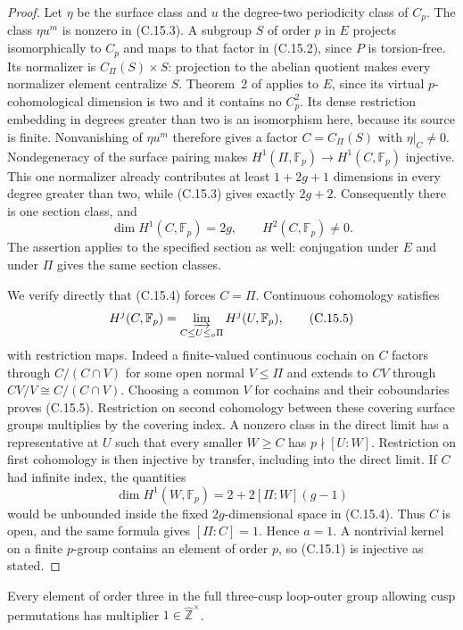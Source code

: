 \begin{proof}
Let $\eta$ be the surface class and $u$ the degree-two
periodicity class of $C_p$.  The class $\eta u^m$ is
nonzero in (C.15.3).  A subgroup $S$ of order $p$ in $E$
projects isomorphically to $C_p$ and maps to that factor
in (C.15.2), since $P$ is torsion-free.  Its normalizer is
$C_\Pi(S)\times S$: projection to the abelian quotient
makes every normalizer element centralize $S$.
Theorem~2 of \cite{CEKochloukovaZalesskii2007} applies to
$E$, since its virtual $p$-cohomological dimension is two
and it contains no $C_p^2$.  Its dense restriction
embedding in degrees greater than two is an isomorphism
here, because its source is finite.  Nonvanishing of
$\eta u^m$ therefore gives a factor $C=C_\Pi(S)$ with
$\eta|_C\ne0$.  Nondegeneracy of the surface pairing
makes $H^1(\Pi,\mathbb F_p)\to H^1(C,\mathbb F_p)$
injective.  This one normalizer already contributes at
least $1+2g+1$ dimensions in every degree greater than
two, while (C.15.3) gives exactly $2g+2$.  Consequently
there is one section class, and
\[
 \dim H^1(C,\mathbb F_p)=2g,\qquad H^2(C,\mathbb F_p)\ne0.
                                                               \tag{C.15.4}
\]
The assertion applies to the specified section as well:
conjugation under $E$ and under $\Pi$ gives the same
section classes.

We verify directly that (C.15.4) forces $C=\Pi$.
Continuous cohomology satisfies
\[
 H^j(C,\mathbb F_p)=
 \varinjlim_{C\leq U\leq_o\Pi}H^j(U,\mathbb F_p),
                                                               \tag{C.15.5}
\]
with restriction maps.  Indeed a finite-valued continuous
cochain on $C$ factors through $C/(C\cap V)$ for some
open normal $V\leq\Pi$ and extends to $CV$ through
$CV/V\cong C/(C\cap V)$.  Choosing a common $V$ for
cochains and their coboundaries proves (C.15.5).
Restriction on second cohomology between these covering
surface groups multiplies by the covering index.  A
nonzero class in the direct limit has a representative
at $U$ such that every smaller $W\geq C$ has
$p\nmid[U:W]$.  Restriction on first cohomology is then
injective by transfer, including into the direct limit.
If $C$ had infinite index, the quantities
\[
 \dim H^1(W,\mathbb F_p)=2+2[\Pi:W](g-1)
\]
would be unbounded inside the fixed $2g$-dimensional
space in (C.15.4).  Thus $C$ is open, and the same
formula gives $[\Pi:C]=1$.  Hence $a=1$.
A nontrivial kernel on a finite $p$-group contains an
element of order $p$, so (C.15.1) is injective as stated.
\end{proof}

Every element of order three in the full three-cusp
loop-outer group allowing cusp permutations has
multiplier $1\in\widehat{\mathbb Z}^{\times}$.

